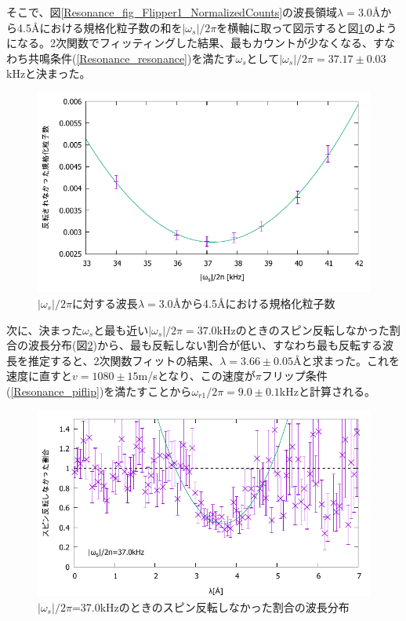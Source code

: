 そこで、図\ref{Resonance_fig_Flipper1_NormalizedCounts}の波長領域$\lambda=$3.0{\AA}から4.5{\AA}における規格化粒子数の和を$|\omega_s|/2\pi$を横軸に取って図示すると図\ref{Resonance_fig_Flipper1_Freq}のようになる。2次関数でフィッティングした結果、最もカウントが少なくなる、すなわち共鳴条件(\ref{Resonance_resonance})を満たす$\omega_s$として$|\omega_s|/2\pi=37.17\pm0.03$kHzと決まった。

\begin{figure}[h]
\centering
\includegraphics[width=12cm]{resonance/analysis/Flipper1_Freq_30-45r.pdf}
\caption{$|\omega_s|/2\pi$に対する波長$\lambda=$3.0{\AA}から4.5{\AA}における規格化粒子数}\label{Resonance_fig_Flipper1_Freq}
\end{figure}

次に、決まった$\omega_s$と最も近い$|\omega_s|/2\pi=37.0$kHzのときのスピン反転しなかった割合の波長分布(図\ref{Resonance_fig_Flipper1_CountsRate_370fit})から、最も反転しない割合が低い、すなわち最も反転する波長を推定すると、2次関数フィットの結果、$\lambda=3.66\pm0.05${\AA}と求まった。これを速度に直すと$v=1080\pm15$m/sとなり、この速度が$\pi$フリップ条件(\ref{Resonance_piflip})を満たすことから$\omega_{r1}/2\pi=9.0\pm0.1$kHzと計算される。
\begin{figure}[h]
\centering
\includegraphics[width=12cm]{resonance/analysis/Flipper1_CountsRate_370kHz_fit.pdf}
\caption{$|\omega_s|/2\pi$=37.0kHzのときのスピン反転しなかった割合の波長分布}\label{Resonance_fig_Flipper1_CountsRate_370fit}
\end{figure}

